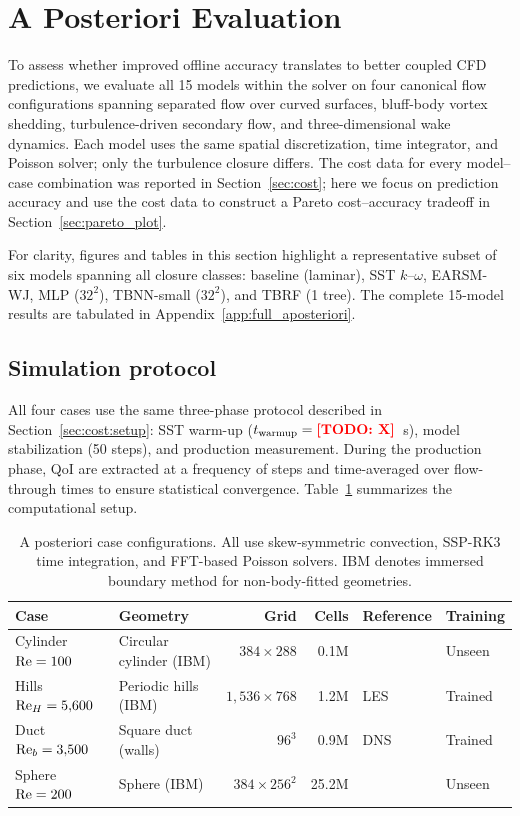 \section{A Posteriori Evaluation}
\label{sec:aposteriori}

To assess whether improved offline accuracy translates to better coupled CFD predictions, we evaluate all 15 models within the solver on four canonical flow configurations spanning separated flow over curved surfaces, bluff-body vortex shedding, turbulence-driven secondary flow, and three-dimensional wake dynamics.
Each model uses the same spatial discretization, time integrator, and Poisson solver; only the turbulence closure differs.
The cost data for every model--case combination was reported in Section~\ref{sec:cost}; here we focus on prediction accuracy and use the cost data to construct a Pareto cost--accuracy tradeoff in Section~\ref{sec:pareto_plot}.

For clarity, figures and tables in this section highlight a representative subset of six models spanning all closure classes: baseline (laminar), SST $k$--$\omega$, EARSM-WJ, MLP ($32^2$), TBNN-small ($32^2$), and TBRF (1 tree).
The complete 15-model results are tabulated in Appendix~\ref{app:full_aposteriori}.

\subsection{Simulation protocol}
\label{sec:aposteriori:protocol}

All four cases use the same three-phase protocol described in Section~\ref{sec:cost:setup}: SST warm-up ($t_\mathrm{warmup} = \textcolor{red}{\textbf{[TODO: X]}}$~s), model stabilization (50 steps), and production measurement.
During the production phase, QoI are extracted at a frequency of  steps and time-averaged over  flow-through times to ensure statistical convergence.
Table~\ref{tab:aposteriori_cases} summarizes the computational setup.

\begin{table}[htbp]
\centering
\caption{A posteriori case configurations. All use skew-symmetric convection, SSP-RK3 time integration, and FFT-based Poisson solvers. IBM denotes immersed boundary method for non-body-fitted geometries.}
\label{tab:aposteriori_cases}
\begin{tabular}{llrrll}
\toprule
Case & Geometry & Grid & Cells & Reference & Training \\
\midrule
Cylinder $\mathrm{Re}=100$ & Circular cylinder (IBM) & $384 \times 288$ & 0.1M & \citet{Tritton1959, Williamson1996} & Unseen \\
Hills $\mathrm{Re}_H=5{,}600$ & Periodic hills (IBM) & $1{,}536 \times 768$ & 1.2M & \citet{Breuer2009} LES & Trained \\
Duct $\mathrm{Re}_b=3{,}500$ & Square duct (walls) & $96^3$ & 0.9M & \citet{Pinelli2010} DNS & Trained \\
Sphere $\mathrm{Re}=200$ & Sphere (IBM) & $384 \times 256^2$ & 25.2M & \citet{Johnson1999} & Unseen \\
\bottomrule
\end{tabular}
\end{table}

